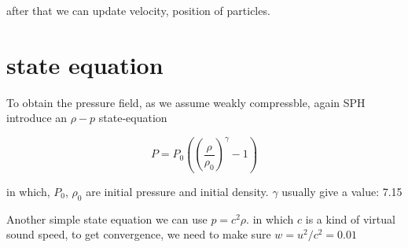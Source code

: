 \documentclass[11pt]{article}
\begin{document}
after that we can update velocity, position of particles.

\section{state equation}
To obtain the pressure field, as we assume weakly compressble, again SPH introduce an $\rho - p$  state-equation 

 $$ P = P_0 ((\frac{\rho}{\rho_0})^\gamma - 1) $$

in which, $ P_0$, $\rho_0$ are initial pressure and initial density. $\gamma$ usually give a value: 7.15

Another simple state equation we can use $p = c^2 \rho $.
in which $c$ is a kind of virtual sound speed, to get convergence, we need to make sure $ w = u^2 / c^2 = 0.01 $ 
\end{document}
